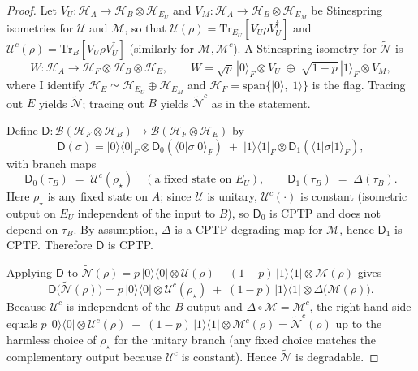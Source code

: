 \documentclass[10pt,a4paper]{amsart}
\begin{document}
\begin{proof}
Let $V_U:\mathcal H_A\!\to\!\mathcal H_B\!\otimes\!\mathcal H_{E_U}$ and $V_M:\mathcal H_A\!\to\!\mathcal H_B\!\otimes\!\mathcal H_{E_M}$ be Stinespring isometries for $\mathcal U$ and $\mathcal M$, so that
$\mathcal U(\rho)=\mathrm{Tr}_{E_U}\!\left[V_U\rho V_U^\dagger\right]$ and
$\mathcal U^c(\rho)=\mathrm{Tr}_{B}\!\left[V_U\rho V_U^\dagger\right]$ (similarly for $\mathcal M,\mathcal M^c$).
A Stinespring isometry for $\widetilde{\mathcal N}$ is
\[
W:\mathcal H_A \to \mathcal H_F\!\otimes\!\mathcal H_B\!\otimes\!\mathcal H_E,\qquad
W=\sqrt{p}\,|0\rangle_F\!\otimes V_U \;\oplus\; \sqrt{1-p}\,|1\rangle_F\!\otimes V_M,
\]
where I identify $\mathcal H_E\simeq \mathcal H_{E_U}\oplus \mathcal H_{E_M}$ and $\mathcal H_F=\mathrm{span}\{|0\rangle,|1\rangle\}$ is the flag.
Tracing out $E$ yields $\widetilde{\mathcal N}$; tracing out $B$ yields $\widetilde{\mathcal N}^c$ as in the statement.

Define $\mathsf D:\mathcal B(\mathcal H_F\!\otimes\!\mathcal H_B)\!\to\!\mathcal B(\mathcal H_F\!\otimes\!\mathcal H_E)$ by
\[
\mathsf D(\sigma)= |0\rangle\!\langle 0|_F\!\otimes\!\mathsf D_0(\langle 0|\sigma|0\rangle_F)\;+\;|1\rangle\!\langle 1|_F\!\otimes\!\mathsf D_1(\langle 1|\sigma|1\rangle_F),
\]
with branch maps
\[
\mathsf D_0(\tau_B) \;=\; \mathcal U^c(\rho_\star)\quad(\text{a fixed state on }E_U),\qquad
\mathsf D_1(\tau_B) \;=\; \Delta(\tau_B).
\]
Here $\rho_\star$ is any fixed state on $A$; since $\mathcal U$ is unitary, $\mathcal U^c(\cdot)$ is constant (isometric output on $E_U$ independent of the input to $B$), so $\mathsf D_0$ is CPTP and does not depend on $\tau_B$. By assumption, $\Delta$ is a CPTP degrading map for $\mathcal M$, hence $\mathsf D_1$ is CPTP. Therefore $\mathsf D$ is CPTP.

Applying $\mathsf D$ to $\widetilde{\mathcal N}(\rho)=p\,|0\rangle\!\langle 0|\!\otimes\!\mathcal U(\rho)+(1-p)\,|1\rangle\!\langle 1|\!\otimes\!\mathcal M(\rho)$ gives
\[
\mathsf D\!\big(\widetilde{\mathcal N}(\rho)\big)=
p\,|0\rangle\!\langle 0|\!\otimes\!\mathcal U^c(\rho_\star)\;+\;(1-p)\,|1\rangle\!\langle 1|\!\otimes\!\Delta\big(\mathcal M(\rho)\big).
\]
Because $\mathcal U^c$ is independent of the $B$-output and $\Delta\circ\mathcal M=\mathcal M^c$, the right-hand side equals
$p\,|0\rangle\!\langle 0|\!\otimes\!\mathcal U^c(\rho)\;+\;(1-p)\,|1\rangle\!\langle 1|\!\otimes\!\mathcal M^c(\rho)=\widetilde{\mathcal N}^c(\rho)$ up to the harmless choice of $\rho_\star$ for the unitary branch (any fixed choice matches the complementary output because $\mathcal U^c$ is constant). Hence $\widetilde{\mathcal N}$ is degradable.
\end{proof}
\end{document}
